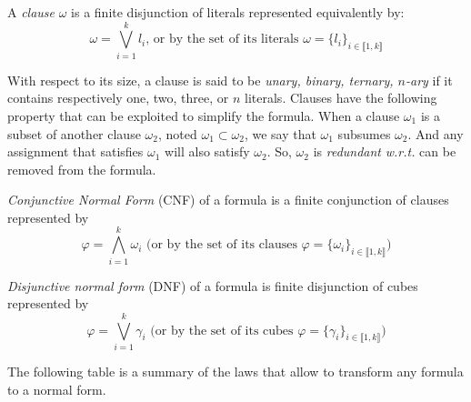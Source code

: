 \begin{definition}[Clause]
A \emph{clause} $\omega$ is a finite disjunction of literals represented equivalently by:
$$\omega = \bigvee_{i=1}^k l_i \text{, or by the set of its literals } \omega = \{l_i\}_{i \in \llbracket 1,k \rrbracket}$$
\end{definition}

With respect to its size, a clause is said to be \emph{unary, binary, ternary, $n$-ary} if it contains respectively one, two, three, or $n$ literals.
Clauses have the following property that can be exploited to simplify the formula.
When a clause $\omega_1$ is a subset of another clause $\omega_2$, noted $\omega_1 \subset \omega_2$,
we say that $\omega_{1}$ subsumes $\omega_{2}$.
 And any assignment that satisfies $\omega_1$ will also satisfy $\omega_2$. So, $\omega_2$ is \emph{redundant} \textit{w.r.t.}  can be removed from the formula.
 
 \clearpage
 
\begin{definition}
 \emph{Conjunctive Normal Form} (CNF) of a formula is a finite conjunction of clauses represented by
 $$\varphi = \bigwedge_{i=1}^k \omega_i \text{ (or by the set of its clauses } \varphi = \{\omega_i\}_{i \in \llbracket 1,k \rrbracket}\text{)}$$
\end{definition}

 \begin{definition}
\emph{Disjunctive normal form} (DNF) of a formula is finite disjunction of cubes represented by
$$\varphi = \bigvee_{i=1}^k \gamma_i \text{ (or by the set of its cubes } \varphi = \{\gamma_i\}_{i \in \llbracket 1,k \rrbracket}\text{)}$$
 \end{definition}

The following table is a summary of the laws that allow to transform any formula to
a normal form.

